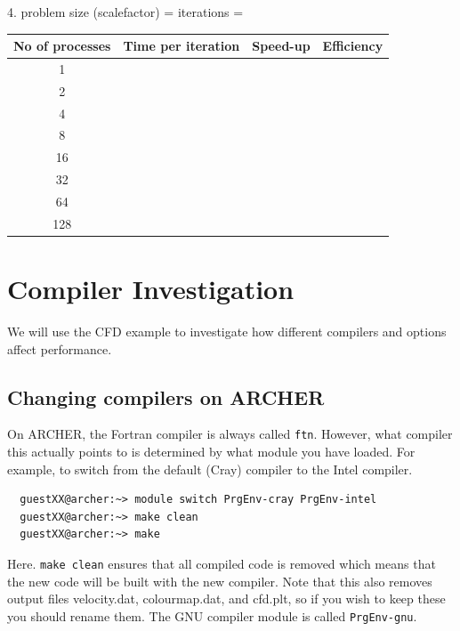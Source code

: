 \documentclass{article}
\begin{document}
4. problem size (scalefactor) = \underline{\hspace{3cm}} iterations =\underline{\hspace{3cm}}

\begin{center}
\begin{tabular}{|c||c|c|c|}
\hline
No of processes & Time per iteration & Speed-up & Efficiency \\
\hline
\hline
1 & & & \\
\hline
2 & & & \\
\hline
4 & & & \\
\hline
8 & & & \\
\hline
16 & & & \\
\hline
32 & & & \\
\hline
64 & & & \\
\hline
128 & & & \\
\hline
\end{tabular}
\end{center}

\newpage

\section{Compiler Investigation}

We will use the CFD example to investigate how different compilers and
options affect performance.

\subsection{Changing compilers on ARCHER}

On ARCHER, the Fortran compiler is always called \verb+ftn+. However,
what compiler this actually points to is determined by what module you
have loaded.
For example, to switch from the default (Cray) compiler to the Intel
compiler.


\begin{verbatim}
  guestXX@archer:~> module switch PrgEnv-cray PrgEnv-intel
  guestXX@archer:~> make clean
  guestXX@archer:~> make
\end{verbatim}

Here. \verb+make clean+ ensures that all compiled code is removed
which means that the new code will be built with the new
compiler. Note that this also removes output files velocity.dat,
colourmap.dat, and cfd.plt, so if you wish to keep these you should
rename them.  The GNU compiler module is called
\verb+PrgEnv-gnu+.
\end{document}
